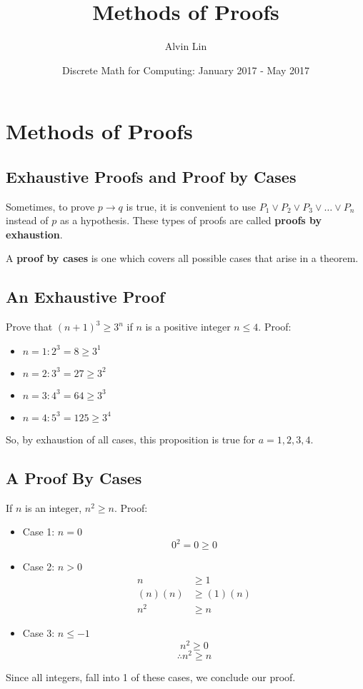 \documentclass{math}
\title{Methods of Proofs}
\author{Alvin Lin}
\date{Discrete Math for Computing: January 2017 - May 2017}
\begin{document}
\maketitle

\section*{Methods of Proofs}

\subsection*{Exhaustive Proofs and Proof by Cases}
Sometimes, to prove \( p \to q \) is true, it is convenient to use
\( P_{1} \vee P_{2} \vee P_{3} \vee \dots \vee P_{n} \) instead of \( p \)
as a hypothesis. These types of proofs are called \textbf{proofs by
exhaustion}. \par
A \textbf{proof by cases} is one which covers all possible cases that arise in
a theorem.

\subsection*{An Exhaustive Proof}
Prove that \( (n+1)^{3} \geq 3^{n} \) if \( n \) is a positive integer
\( n \leq 4 \). Proof:
\begin{itemize}
  \item \( n = 1: 2^{3} = 8 \geq 3^{1} \)
  \item \( n = 2: 3^{3} = 27 \geq 3^{2} \)
  \item \( n = 3: 4^{3} = 64 \geq 3^{3} \)
  \item \( n = 4: 5^{3} = 125 \geq 3^{4} \)
\end{itemize}
So, by exhaustion of all cases, this proposition is true for \( a = 1,2,3,4 \).

\subsection*{A Proof By Cases}
If \( n \) is an integer, \( n^{2} \geq n \). Proof:
\begin{itemize}
  \item Case 1: \( n = 0 \)
    \[ 0^{2} = 0 \geq 0 \]
  \item Case 2: \( n > 0 \)
    \begin{align*}
      n &\geq 1 \\
      (n)(n) &\geq (1)(n) \\
      n^{2} &\geq n
    \end{align*}
  \item Case 3: \( n \leq -1 \)
    \[ n^{2} \geq 0 \]
    \[ \therefore n^{2} \geq n \]
\end{itemize}
Since all integers, fall into 1 of these cases, we conclude our proof.
\end{document}

